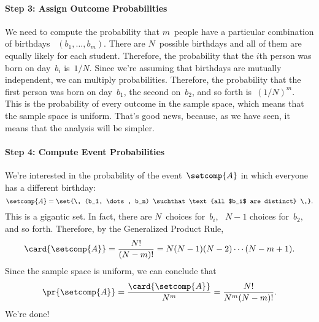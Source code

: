 \begin{editingnotes}
\paragraph{Step 3: Assign Outcome Probabilities}

We need to compute the probability that $m$~people have a particular
combination of birthdays ~$(b_1, \dots, b_m)$.  There are $N$~possible
birthdays and all of them are equally likely for each student.
Therefore, the probability that the $i$th person was born on day~$b_i$
is~$1/N$.  Since we're assuming that birthdays are mutually
independent, we can multiply probabilities.  Therefore, the
probability that the first person was born on day~$b_1$, the second
on~$b_2$, and so forth is~$(1/N)^m$.  This is the probability of every
outcome in the sample space, which means that the sample space is
uniform.  That's good news, because, as we have seen, it means that
the analysis will be simpler.

\paragraph{Step 4: Compute Event Probabilities}

We're interested in the probability of the event~$\setcomp{A}$ in
which everyone has a different birthday:
\begin{equation*}
    \setcomp{A} = \set{\, (b_1, \dots, b_n) \suchthat
                            \text{all $b_i$ are distinct} \,}.
\end{equation*}
This is a gigantic set.  In fact, there are $N$~choices for~$b_i$,
\ $N - 1$ choices for~$b_2$, and so forth.  Therefore, by the
Generalized Product Rule,
\begin{equation*}
\card{\setcomp{A}}
    = \frac{N!}{(N - m)!}
    = N (N - 1) (N - 2) \cdots (N - m + 1).
\end{equation*}
Since the sample space is uniform, we can conclude that
\begin{equation}\label{eqn:15E4}
\pr{\setcomp{A}}
    = \frac{\card{\setcomp{A}}}{N^m} \\
    = \frac{N!}{N^m (N - m)!}.
\end{equation}
We're done!


\end{editingnotes}
